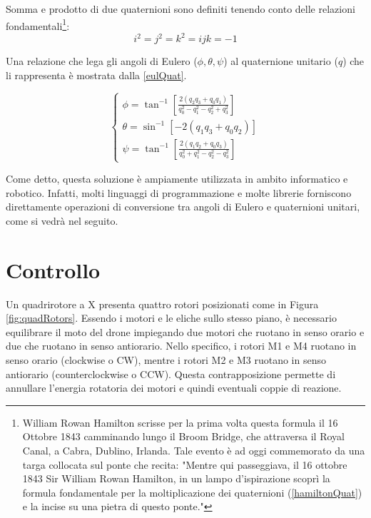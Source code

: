 Somma e prodotto di due quaternioni sono definiti tenendo conto delle relazioni fondamentali\footnote{William Rowan Hamilton scrisse per la prima volta questa formula il 16 Ottobre 1843 camminando lungo il Broom Bridge, che attraversa il Royal Canal, a Cabra, Dublino, Irlanda. Tale evento è ad oggi commemorato da una targa collocata sul ponte che recita: "Mentre qui passeggiava, il 16 ottobre 1843 Sir William Rowan Hamilton, in un lampo d'ispirazione scoprì la formula fondamentale per la moltiplicazione dei quaternioni (\ref{hamiltonQuat}) e la incise su una pietra di questo ponte."}:
\begin{equation}
	 i^2 = j^2 = k^2 = ijk = -1
	 \label{hamiltonQuat}
\end{equation}

Una relazione che lega gli angoli di Eulero ($\phi, \theta, \psi$) al quaternione unitario ($q$) che li rappresenta è mostrata dalla \ref{eulQuat}.

\begin{equation}
	\begin{cases}
		\phi = \tan^{-1} \left[\frac{2(q_2q_3 + q_0q_1)}{q_0^2 - q_1^2 - q_2^2 + q_3^2}\right] \\
		\theta = \sin^{-1} \left[-2(q_1q_3 + q_0q_2)\right] \\
		\psi = \tan^{-1} \left[\frac{2(q_1q_2 + q_0q_3)}{q_0^2 + q_1^2 - q_2^2 - q_3^2}\right]
	\end{cases}
	\label{eulQuat}
\end{equation}

Come detto, questa soluzione è ampiamente utilizzata in ambito informatico e robotico. Infatti, molti linguaggi di programmazione e molte librerie forniscono direttamente operazioni di conversione tra angoli di Eulero e quaternioni unitari, come si vedrà nel seguito.


\section{Controllo}
Un quadrirotore a X presenta quattro rotori posizionati come in Figura \ref{fig:quadRotors}. Essendo i motori e le eliche sullo stesso piano, è necessario equilibrare il moto del drone impiegando due motori che ruotano in senso orario e due che ruotano in senso antiorario. Nello specifico, i rotori M1 e M4 ruotano in senso orario (clockwise o CW), mentre i rotori M2 e M3 ruotano in senso antiorario (counterclockwise o CCW). Questa contrapposizione permette di annullare l'energia rotatoria dei motori e quindi eventuali coppie di reazione.

